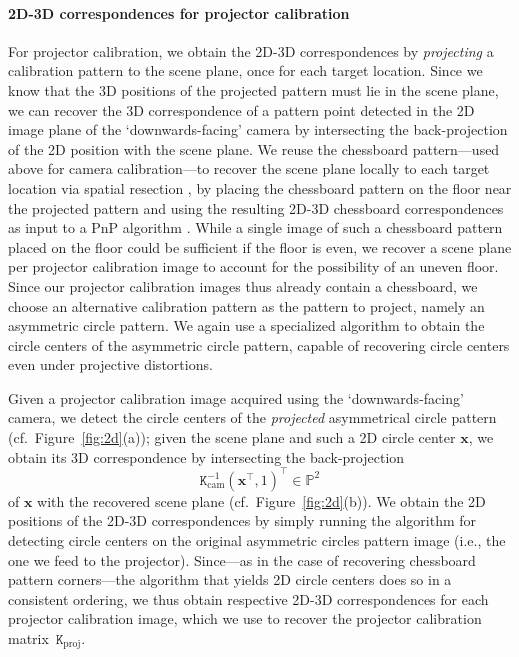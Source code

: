 \documentclass[review]{elsarticle}
\begin{document}
\paragraph{2D-3D correspondences for projector calibration} For projector calibration, we obtain the 2D-3D correspondences by \textit{projecting} a calibration pattern to the scene plane, once for each target location. Since we know that the 3D positions of the projected pattern must lie in the scene plane, we can recover the 3D correspondence of a pattern point detected in the 2D image plane of the `downwards-facing' camera by intersecting the back-projection of the 2D position with the scene plane. We reuse the chessboard pattern---used above for camera calibration---to recover the scene plane locally to each target location via spatial resection \cite{Hartley2004}, by placing the chessboard pattern on the floor near the projected pattern and using the resulting 2D-3D chessboard correspondences as input to a PnP algorithm \cite{collins2014infinitesimal}. While a single image of such a chessboard pattern placed on the floor could be sufficient if the floor is even, we recover a scene plane per projector calibration image to account for the possibility of an uneven floor. Since our projector calibration images thus already contain a chessboard, we choose an alternative calibration pattern as the pattern to project, namely an asymmetric circle pattern. We again use a specialized algorithm \cite{bradski2000opencv} to obtain the circle centers of the asymmetric circle pattern, capable of recovering circle centers even under projective distortions. 

Given a projector calibration image acquired using the `downwards-facing' camera, we detect the circle centers of the \textit{projected} asymmetrical circle pattern (cf.\ Figure~\ref{fig:2d}(a)); given the scene plane and such a 2D circle center $\mathbf{x}$, we obtain its 3D correspondence by intersecting the back-projection
\begin{equation}
\mathtt{K}_\text{cam}^{-1}(\mathbf{x}^\top, 1)^\top \in \mathbb{P}^2
\end{equation}
of $\mathbf{x}$ with the recovered scene plane (cf.\ Figure~\ref{fig:2d}(b)). We obtain the 2D positions of the 2D-3D correspondences by simply running the algorithm for detecting circle centers on the original asymmetric circles pattern image (i.e., the one we feed to the projector). Since---as in the case of recovering chessboard pattern corners---the algorithm that yields 2D circle centers does so in a consistent ordering, we thus obtain respective 2D-3D correspondences for each projector calibration image, which we use to recover the projector calibration matrix~$\mathtt{K}_\text{proj}$.
\end{document}
